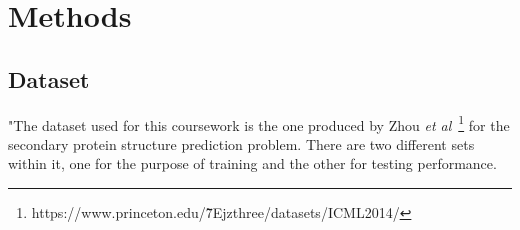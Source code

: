 \chapter{Methods} \label{Chapter: Methods}








\section{Dataset}
"The dataset used for this coursework is the one produced by Zhou \textit{et al}~\cite{Zhou2014}\footnote{https://www.princeton.edu/\~7Ejzthree/datasets/ICML2014/} for the secondary protein structure prediction problem. There are two different sets within it, one for the purpose of training and the other for testing performance.

